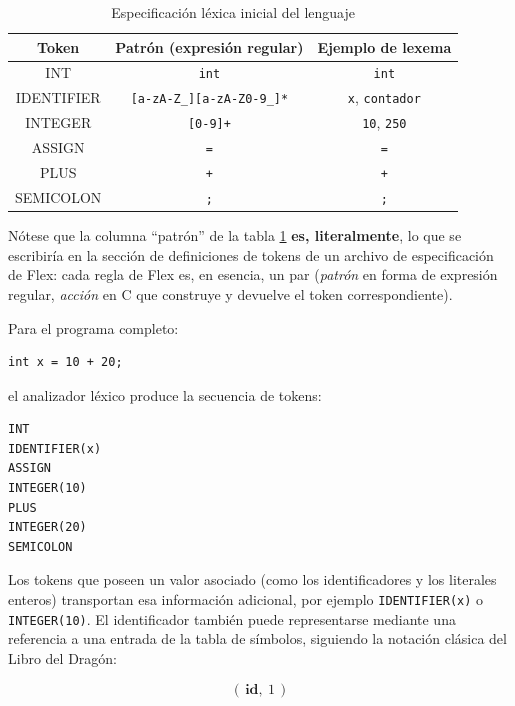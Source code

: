 \documentclass[11pt,a4paper]{article}
\begin{document}
\begin{table}[H]
\centering
\begin{tabular}{>{\ttfamily}c c c}
\toprule
\textbf{Token} & \textbf{Patrón (expresión regular)} & \textbf{Ejemplo de lexema} \\
\midrule
INT &
\texttt{int} &
\texttt{int} \\

IDENTIFIER &
\texttt{[a-zA-Z\_][a-zA-Z0-9\_]*} &
\texttt{x}, \texttt{contador} \\

INTEGER &
\texttt{[0-9]+} &
\texttt{10}, \texttt{250} \\

ASSIGN &
\texttt{=} &
\texttt{=} \\

PLUS &
\texttt{+} &
\texttt{+} \\

SEMICOLON &
\texttt{;} &
\texttt{;} \\
\bottomrule
\end{tabular}
\caption{Especificación léxica inicial del lenguaje}
\label{tab:tokens}
\end{table}

Nótese que la columna ``patrón'' de la tabla \ref{tab:tokens} \textbf{es, literalmente}, lo que
se escribiría en la sección de definiciones de tokens de un archivo de especificación de Flex:
cada regla de Flex es, en esencia, un par (\textit{patrón} en forma de expresión regular,
\textit{acción} en C que construye y devuelve el token correspondiente).

Para el programa completo:

\begin{lstlisting}
int x = 10 + 20;
\end{lstlisting}

el analizador léxico produce la secuencia de tokens:

\begin{lstlisting}
INT
IDENTIFIER(x)
ASSIGN
INTEGER(10)
PLUS
INTEGER(20)
SEMICOLON
\end{lstlisting}

Los tokens que poseen un valor asociado (como los identificadores y los literales enteros)
transportan esa información adicional, por ejemplo \texttt{IDENTIFIER(x)} o
\texttt{INTEGER(10)}. El identificador también puede representarse mediante una referencia a
una entrada de la tabla de símbolos, siguiendo la notación clásica del Libro del Dragón:

\[
(\,\mathbf{id},\ 1\,)
\]
\end{document}

